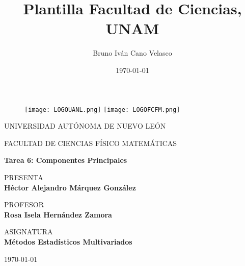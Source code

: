 \documentclass{article}
\title{Plantilla Facultad de Ciencias, UNAM}
\author{Bruno Iván Cano Velasco}
\date{\today}
\begin{document}
\thispagestyle{empty}
	
	\begin{figure}[ht]
			\texttt{[image: LOGOUANL.png]}
			\label{EscudoUNAM}
	   \endminipage
			\texttt{[image: LOGOFCFM.png]}
			\label{EscudoFC}
		\endminipage
	\end{figure}
	
	\begin{center}
	\vspace{0.8cm}
	\LARGE
	UNIVERSIDAD AUTÓNOMA DE NUEVO LEÓN
	
	\vspace{0.8cm}
	\LARGE
	FACULTAD DE CIENCIAS FÍSICO MATEMÁTICAS
	
	\vspace{1.7cm}	
	\Large
	\textbf{Tarea 6: Componentes Principales}

	\vspace{1.3cm}
	\normalsize	
	PRESENTA \\
	\vspace{.3cm}
	\large
	\textbf{Héctor Alejandro Márquez González}
	
	\vspace{1.3cm}
	\normalsize	
	PROFESOR \\
	\vspace{.3cm}
	\large
	\textbf{Rosa Isela Hernández Zamora}
	
	\vspace{1.3cm}
	\normalsize	
	ASIGNATURA \\
	\vspace{.3cm}
	\large
	\textbf{Métodos Estadísticos Multivariados}
	
	\vspace{1.3cm}
	\today
	\end{center}
	
	\newpage
	
\end{document}
